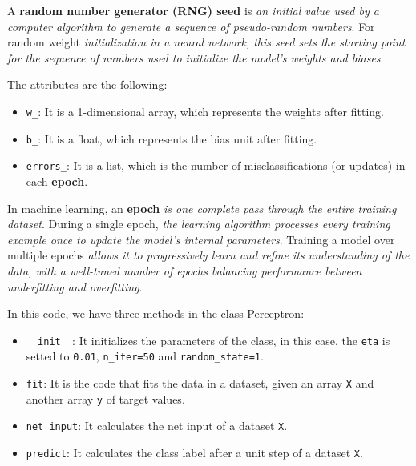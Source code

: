 \documentclass[../machine_learning_scikit.tex]{subfiles}
\begin{document}
    \begin{mydef}
        A \textbf{random number generator (RNG) seed} is \textit{an initial value used by a computer algorithm to generate a sequence of pseudo-random numbers}. For random weight \textit{initialization in a neural network, this seed sets the starting point for the sequence of numbers used to initialize the model's weights and biases}.
    \end{mydef}

    The attributes are the following:
    \begin{itemize}
        \item \lstinline|w_|: It is a 1-dimensional array, which represents the weights after fitting.
        \item \lstinline|b_|: It is a float, which represents the bias unit after fitting.
        \item \lstinline|errors_|: It is a list, which is the number of misclassifications (or updates) in each \textbf{epoch}.
    \end{itemize}

    \begin{mydef}
        In machine learning, an \textbf{epoch} \textit{is one complete pass through the entire training dataset}. During a single epoch, \textit{the learning algorithm processes every training example once to update the model's internal parameters}. Training a model over multiple epochs \textit{allows it to progressively learn and refine its understanding of the data, with a well-tuned number of epochs balancing performance between underfitting and overfitting}.
    \end{mydef}

    In this code, we have three methods in the class Perceptron:
    \begin{itemize}
        \item \lstinline|__init__|: It initializes the parameters of the class, in this case, the \lstinline|eta| is setted to \lstinline|0.01|, \lstinline|n_iter=50| and \lstinline|random_state=1|.
        \item \lstinline|fit|: It is the code that fits the data in a dataset, given an array \lstinline|X| and another array \lstinline|y| of target values.
        \item \lstinline|net_input|: It calculates the net input of a dataset \lstinline|X|.
        \item \lstinline|predict|: It calculates the class label after a unit step of a dataset \lstinline|X|.
    \end{itemize}
\end{document}
